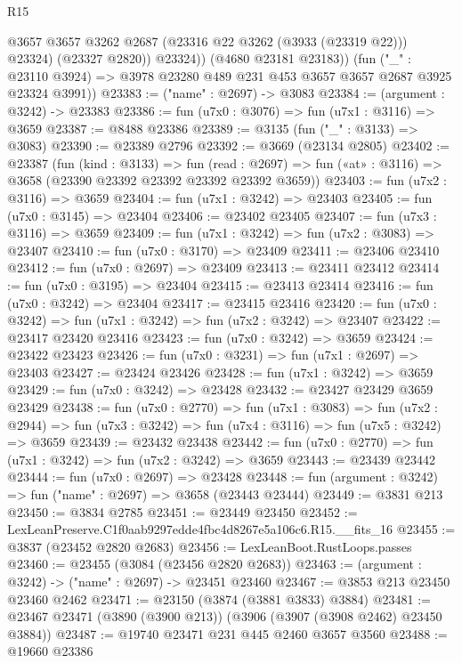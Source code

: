 \begin{lexlean}{R15}
\begin{coremodule}
                @3657
                @3657
                @3262
                @2687
                (@23316 @22 @3262 (@3933 (@23319 @22)))
                @23324)
              (@23327 @2820))
            @23324))
        (@4680 @23181 @23183))
      (fun ("_" : @23110 @3924) =>
      @3978 @23280 @489 @231 @453 @3657 @3657 @2687 @3925 @23324 @3991))
@23383 := ("name" : @2697) -> @3083
@23384 := (argument : @3242) -> @23383
@23386 := fun (u7x0 : @3076) => fun (u7x1 : @3116) => @3659
@23387 := @8488 @23386
@23389 := @3135 (fun ("_" : @3133) => @3083)
@23390 := @23389 @2796
@23392 := @3669 (@23134 @2805)
@23402 := @23387
    (fun (kind : @3133) =>
    fun (read : @2697) => fun («at» : @3116) => @3658 (@23390 @23392 @23392 @23392 @23392 @3659))
@23403 := fun (u7x2 : @3116) => @3659
@23404 := fun (u7x1 : @3242) => @23403
@23405 := fun (u7x0 : @3145) => @23404
@23406 := @23402 @23405
@23407 := fun (u7x3 : @3116) => @3659
@23409 := fun (u7x1 : @3242) => fun (u7x2 : @3083) => @23407
@23410 := fun (u7x0 : @3170) => @23409
@23411 := @23406 @23410
@23412 := fun (u7x0 : @2697) => @23409
@23413 := @23411 @23412
@23414 := fun (u7x0 : @3195) => @23404
@23415 := @23413 @23414
@23416 := fun (u7x0 : @3242) => @23404
@23417 := @23415 @23416
@23420 := fun (u7x0 : @3242) => fun (u7x1 : @3242) => fun (u7x2 : @3242) => @23407
@23422 := @23417 @23420 @23416
@23423 := fun (u7x0 : @3242) => @3659
@23424 := @23422 @23423
@23426 := fun (u7x0 : @3231) => fun (u7x1 : @2697) => @23403
@23427 := @23424 @23426
@23428 := fun (u7x1 : @3242) => @3659
@23429 := fun (u7x0 : @3242) => @23428
@23432 := @23427 @23429 @3659 @23429
@23438 := fun (u7x0 : @2770) =>
  fun (u7x1 : @3083) =>
  fun (u7x2 : @2944) => fun (u7x3 : @3242) => fun (u7x4 : @3116) => fun (u7x5 : @3242) => @3659
@23439 := @23432 @23438
@23442 := fun (u7x0 : @2770) => fun (u7x1 : @3242) => fun (u7x2 : @3242) => @3659
@23443 := @23439 @23442
@23444 := fun (u7x0 : @2697) => @23428
@23448 := fun (argument : @3242) => fun ("name" : @2697) => @3658 (@23443 @23444)
@23449 := @3831 @213
@23450 := @3834 @2785
@23451 := @23449 @23450
@23452 := LexLeanPreserve.C1f0aab9297edde4fbc4d8267e5a106c6.R15.__fits_16
@23455 := @3837 (@23452 @2820 @2683)
@23456 := LexLeanBoot.RustLoops.passes
@23460 := @23455 (@3084 (@23456 @2820 @2683))
@23463 := (argument : @3242) -> ("name" : @2697) -> @23451 @23460
@23467 := @3853 @213 @23450 @23460 @2462
@23471 := @23150 (@3874 (@3881 @3833) @3884)
@23481 := @23467 @23471 (@3890 (@3900 @213)) (@3906 (@3907 (@3908 @2462) @23450 @3884))
@23487 := @19740 @23471 @231 @445 @2460 @3657 @3560
@23488 := @19660 @23386

\end{coremodule}
\end{lexlean}
